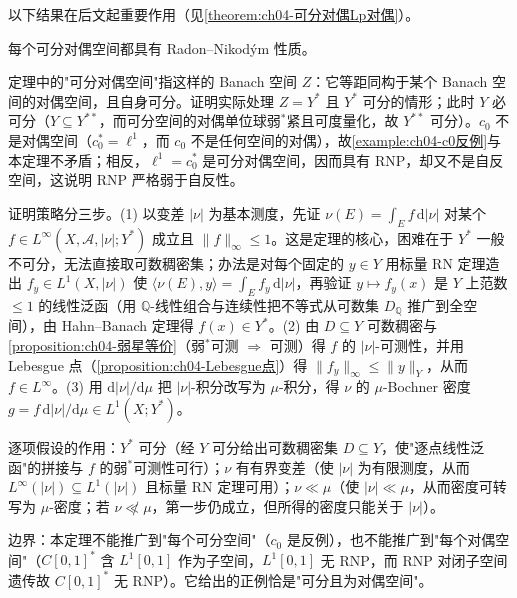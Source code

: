 \documentclass[../../main.tex]{subfiles}%
\begin{document}
以下结果在后文起重要作用（见\cref{theorem:ch04-可分对偶Lp对偶}）。

\begin{theorem}\label{theorem:ch04-DunfordPettis}
每个可分对偶空间都具有 Radon--Nikodým 性质。
\end{theorem}

\begin{remark}\label{remark:ch04-DunfordPettis}
定理中的"可分对偶空间"指这样的 Banach 空间 $Z$：它等距同构于某个 Banach 空间的对偶空间，且自身可分。证明实际处理 $Z=Y^*$ 且 $Y^*$ 可分的情形；此时 $Y$ 必可分（$Y\subseteq Y^{**}$，而可分空间的对偶单位球弱$^*$紧且可度量化，故 $Y^{**}$ 可分）。$c_0$ 不是对偶空间（$c_0^*=\ell^1$，而 $c_0$ 不是任何空间的对偶），故\cref{example:ch04-c0反例}与本定理不矛盾；相反，$\ell^1=c_0^*$ 是可分对偶空间，因而具有 RNP，却又不是自反空间，这说明 RNP 严格弱于自反性。

证明策略分三步。(1) 以变差 $|\nu|$ 为基本测度，先证 $\nu(E)=\int_E f\,\mathrm{d}|\nu|$ 对某个 $f\in L^\infty(X,\mathcal{A},|\nu|;Y^*)$ 成立且 $\|f\|_\infty\leqslant1$。这是定理的核心，困难在于 $Y^*$ 一般不可分，无法直接取可数稠密集；办法是对每个固定的 $y\in Y$ 用标量 RN 定理造出 $f_y\in L^1(X,|\nu|)$ 使 $\langle\nu(E),y\rangle=\int_E f_y\,\mathrm{d}|\nu|$，再验证 $y\mapsto f_y(x)$ 是 $Y$ 上范数 $\leqslant1$ 的线性泛函（用 $\mathbb{Q}$-线性组合与连续性把不等式从可数集 $D_{\mathbb{Q}}$ 推广到全空间），由 Hahn--Banach 定理得 $f(x)\in Y^*$。(2) 由 $D\subseteq Y$ 可数稠密与\cref{proposition:ch04-弱星等价}（弱$^*$可测 $\Rightarrow$ 可测）得 $f$ 的 $|\nu|$-可测性，并用 Lebesgue 点（\cref{proposition:ch04-Lebesgue点}）得 $\|f_y\|_\infty\leqslant\|y\|_Y$，从而 $f\in L^\infty$。(3) 用 $\mathrm{d}|\nu|/\mathrm{d}\mu$ 把 $|\nu|$-积分改写为 $\mu$-积分，得 $\nu$ 的 $\mu$-Bochner 密度 $g=f\,\mathrm{d}|\nu|/\mathrm{d}\mu\in L^1(X;Y^*)$。

逐项假设的作用：$Y^*$ 可分（经 $Y$ 可分给出可数稠密集 $D\subseteq Y$，使"逐点线性泛函"的拼接与 $f$ 的弱$^*$可测性可行）；$\nu$ 有有界变差（使 $|\nu|$ 为有限测度，从而 $L^\infty(|\nu|)\subseteq L^1(|\nu|)$ 且标量 RN 定理可用）；$\nu\ll\mu$（使 $|\nu|\ll\mu$，从而密度可转写为 $\mu$-密度；若 $\nu\not\ll\mu$，第一步仍成立，但所得的密度只能关于 $|\nu|$）。

边界：本定理不能推广到"每个可分空间"（$c_0$ 是反例），也不能推广到"每个对偶空间"（$C[0,1]^*$ 含 $L^1[0,1]$ 作为子空间，$L^1[0,1]$ 无 RNP，而 RNP 对闭子空间遗传故 $C[0,1]^*$ 无 RNP）。它给出的正例恰是"可分且为对偶空间"。
\end{remark}
\end{document}
